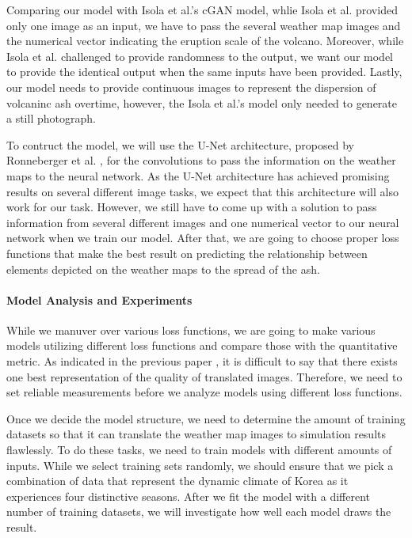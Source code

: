 \documentclass{article}
\begin{document}
\begin{doublespacing}
{  Comparing our model with Isola et al.\cite{isola2016imagetoimage}'s cGAN model, whlie Isola et 
  al. provided only one image as an input, we have to pass the several weather map images and the 
  numerical vector indicating the eruption scale of the volcano. Moreover, while Isola et 
  al.\cite{isola2016imagetoimage} challenged to provide randomness to the output, we want our model 
  to provide the identical output when the same inputs have been provided. Lastly, our model needs 
  to provide continuous images to represent the dispersion of volcaninc ash overtime, however, the 
  Isola et al.\cite{isola2016imagetoimage}'s model only needed to generate a still photograph.

  To contruct the model, we will use the U-Net architecture, proposed by Ronneberger et al.
  \cite{ronneberger2015unet}, for the convolutions to pass the information on the weather maps to 
  the neural network. As the U-Net architecture has achieved promising results on several different
  image tasks\cite{isola2016imagetoimage,james2018simtoreal}, we expect that this architecture will 
  also work for our task. However, we still have to come up with a solution to pass information from
  several different images and one numerical vector to our neural network when we train our model. 
  After that, we are going to choose proper loss functions that make the best result on predicting 
  the relationship between elements depicted on the weather maps to the spread of the ash.

  \paragraph{Model Analysis and Experiments}
  While we manuver over various loss functions, we are going to make various models utilizing 
  different loss functions and compare those with the quantitative metric. As indicated in the 
  previous paper \cite{isola2016imagetoimage}, it is difficult to say that there exists one best 
  representation of the quality of translated images. Therefore, we need to set reliable 
  measurements before we analyze models using different loss functions.

  Once we decide the model structure, we need to determine the amount of training datasets so that 
  it can translate the weather map images to simulation results flawlessly. To do these tasks, we 
  need to train models with different amounts of inputs. While we select training sets randomly, we 
  should ensure that we pick a combination of data that represent the dynamic climate of Korea as it
  experiences four distinctive seasons. After we fit the model with a different number of training 
  datasets, we will investigate how well each model draws the result.
}


\end{doublespacing}
\end{document}
